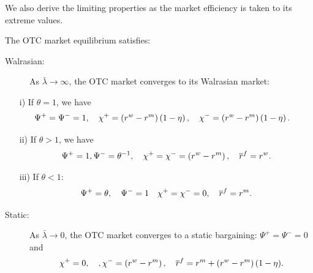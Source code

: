 \documentclass[12pt,american,english,notitlepage]{article}
\begin{document}
We also derive the limiting properties as the market efficiency is
taken to its extreme values. 
\begin{proposition} \label{prop:LambdaLimit}
The OTC market equilibrium satisfies:
\begin{description}
\item [{Walrasian:}] As $\bar{\lambda}\rightarrow\infty$, the OTC market converges to its Walrasian market:
\end{description}
\begin{itemize}
\item [i)] If $\theta=1$, we have
\begin{align}
\Psi^{+}=\Psi^{-}=1, \quad \chi^{+} =   \left(r^{w} - r^{m} \right)\left(1 - \eta \right), \quad  \chi^{-}= \left(r^{w} - r^{m} \right)\left(1 - \eta \right). \quad \notag 
\end{align}

 \vspace{-13pt}
 
\item [ii)] If $\theta>1$, we have
\begin{align}
\Psi^{+}=1,\Psi^{-}=\theta^{-1}, \quad 
 \chi^{+}=\chi^{-}=\left(r^{w}-r^{m}\right),\quad\overline{r}^{f}=r^{w}. \notag 
 \end{align}
 
 \vspace{-13pt}
 
\item [iii)] If  $\theta<1$:
\begin{align}
{\Psi^{+}=\theta, \quad  \Psi^{-}=1 \quad 
  \chi^{+}=\chi^{-}=0,\quad\overline{r}^{f}=r^{m}.} \notag 
 \end{align}
\end{itemize}
\begin{description}
\item [{Static:}] As $\bar{\lambda}\rightarrow0$, the OTC market converges
to a static bargaining:{ $\Psi^{+}=\Psi^{-}=0$}
and 
\begin{align}
 \chi^{+}  =  0, \quad  ,\chi^{-} =\left(r^{w}-r^{m}\right)  , \quad \overline{r}^{f}=r^{m}+\left(r^{w}-r^{m}\right)(1-\eta). \notag 
 \end{align}
\end{description}
\end{proposition}
\end{document}
